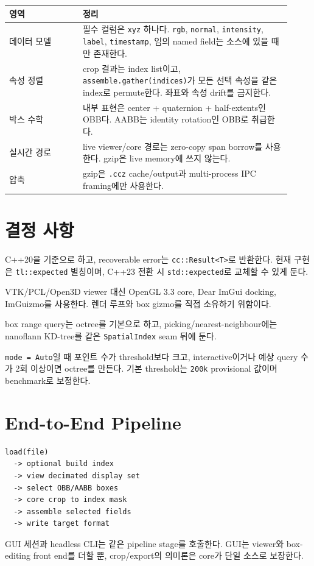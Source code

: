 \begin{longtable}{p{0.24\linewidth}p{0.68\linewidth}}
\toprule
\textbf{영역} & \textbf{정리} \\
\midrule
데이터 모델 & 필수 컬럼은 \texttt{xyz} 하나다. \texttt{rgb}, \texttt{normal},
\texttt{intensity}, \texttt{label}, \texttt{timestamp}, 임의 named field는
소스에 있을 때만 존재한다. \\
속성 정렬 & crop 결과는 index list이고, \texttt{assemble.gather(indices)}가
모든 선택 속성을 같은 index로 permute한다. 좌표와 속성 drift를 금지한다. \\
박스 수학 & 내부 표현은 center + quaternion + half-extents인 OBB다. AABB는
identity rotation인 OBB로 취급한다. \\
실시간 경로 & live viewer/core 경로는 zero-copy span borrow를 사용한다.
gzip은 live memory에 쓰지 않는다. \\
압축 & gzip은 \texttt{.ccz} cache/output과 multi-process IPC framing에만
사용한다. \\
\bottomrule
\end{longtable}

\section{결정 사항}

{C++20을 기준으로 하고, recoverable error는 \texttt{cc::Result<T>}로 반환한다.
현재 구현은 \texttt{tl::expected} 별칭이며, C++23 전환 시
\texttt{std::expected}로 교체할 수 있게 둔다.}

{VTK/PCL/Open3D viewer 대신 OpenGL 3.3 core, Dear ImGui docking,
ImGuizmo를 사용한다. 렌더 루프와 box gizmo를 직접 소유하기 위함이다.}

{box range query는 octree를 기본으로 하고, picking/nearest-neighbour에는
nanoflann KD-tree를 같은 \texttt{SpatialIndex} seam 뒤에 둔다.}

{\texttt{mode = Auto}일 때 포인트 수가 threshold보다 크고, interactive이거나
예상 query 수가 2회 이상이면 octree를 만든다. 기본 threshold는
\texttt{200k} provisional 값이며 benchmark로 보정한다.}

\section{End-to-End Pipeline}

\begin{lstlisting}
load(file)
  -> optional build index
  -> view decimated display set
  -> select OBB/AABB boxes
  -> core crop to index mask
  -> assemble selected fields
  -> write target format
\end{lstlisting}

GUI 세션과 headless CLI는 같은 pipeline stage를 호출한다. GUI는 viewer와
box-editing front end를 더할 뿐, crop/export의 의미론은 core가 단일 소스로
보장한다.


